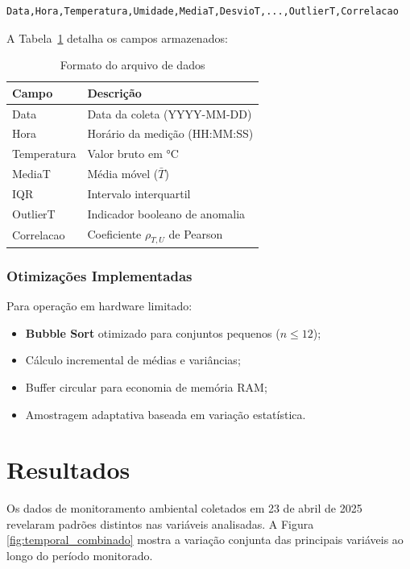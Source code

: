 \documentclass[12pt, a4paper]{article}
\begin{document}
\begin{verbatim}
Data,Hora,Temperatura,Umidade,MediaT,DesvioT,...,OutlierT,Correlacao
\end{verbatim}

A Tabela~\ref{tab:formato_dados} detalha os campos armazenados:

\begin{table}[ht]
    \centering
    \caption{Formato do arquivo de dados}
    \label{tab:formato_dados}
    \begin{tabular}{|l|l|}
        \hline
        Campo & Descrição \\ \hline
        \hline
        Data & Data da coleta (YYYY-MM-DD) \\
        \hline
        Hora & Horário da medição (HH:MM:SS) \\
        \hline
        Temperatura & Valor bruto em °C \\
        \hline
        MediaT & Média móvel ($\bar{T}$) \\
        \hline
        IQR & Intervalo interquartil \\
        \hline
        OutlierT & Indicador booleano de anomalia \\
        \hline
        Correlacao & Coeficiente $\rho_{T,U}$ de Pearson \\ \hline
    \end{tabular}
\end{table}

\subsubsection{Otimizações Implementadas}
Para operação em hardware limitado:

\begin{itemize}
    \item \textbf{Bubble Sort} otimizado para conjuntos pequenos ($n \leq 12$);
    \item Cálculo incremental de médias e variâncias;
    \item Buffer circular para economia de memória RAM;
    \item Amostragem adaptativa baseada em variação estatística.
\end{itemize}

\section{Resultados}
\label{sec:resultados}

Os dados de monitoramento ambiental coletados em 23 de abril de 2025  revelaram padrões distintos nas variáveis analisadas. A Figura \ref{fig:temporal_combinado} mostra a variação conjunta das principais variáveis ao longo do período monitorado.
\end{document}
